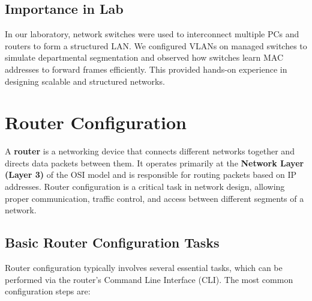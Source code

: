 \documentclass[12pt]{article}
\begin{document}
\subsection{Importance in Lab}
In our laboratory, network switches were used to interconnect multiple PCs and routers to form a structured LAN. We configured VLANs on managed switches to simulate departmental segmentation and observed how switches learn MAC addresses to forward frames efficiently. This provided hands-on experience in designing scalable and structured networks.


\section{Router Configuration}
A \textbf{router} is a networking device that connects different networks together and directs data packets between them. It operates primarily at the \textbf{Network Layer (Layer 3)} of the OSI model and is responsible for routing packets based on IP addresses. Router configuration is a critical task in network design, allowing proper communication, traffic control, and access between different segments of a network.

\subsection{Basic Router Configuration Tasks}
Router configuration typically involves several essential tasks, which can be performed via the router's Command Line Interface (CLI). The most common configuration steps are:
\end{document}
